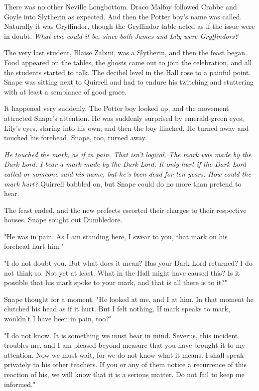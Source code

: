 There was no other Neville Longbottom. Draco Malfoy followed Crabbe and Goyle into Slytherin as expected. And then the Potter boy's name was called. Naturally it was Gryffindor, though the Gryffindor table acted as if the issue were in doubt. \emph{What else could it be, since both James and Lily were Gryffindors?}

The very last student, Blaise Zabini, was a Slytherin, and then the feast began. Food appeared on the tables, the ghosts came out to join the celebration, and all the students started to talk. The decibel level in the Hall rose to a painful point. Snape was sitting next to Quirrell and had to endure his twitching and stuttering with at least a semblance of good grace.

It happened very suddenly. The Potter boy looked up, and the movement attracted Snape's attention. He was suddenly surprised by emerald-green eyes, Lily's eyes, staring into his own, and then the boy flinched. He turned away and touched his forehead. Snape, too, turned away.

\emph{He touched the mark, as if in pain. That isn't logical. The mark was made by the Dark Lord. I bear a mark made by the Dark Lord. It only hurt if the Dark Lord called or someone said his name, but he's been dead for ten years. How could the mark hurt?} Quirrell babbled on, but Snape could do no more than pretend to hear.

The feast ended, and the new prefects escorted their charges to their respective houses. Snape sought out Dumbledore.

"He was in pain. As I am standing here, I swear to you, that mark on his forehead hurt him."

"I do not doubt you. But what does it mean? Has your Dark Lord returned? I do not think so. Not yet at least. What in the Hall might have caused this? Is it possible that his mark spoke to your mark, and that is all there is to it?"

Snape thought for a moment. "He looked at me, and I at him. In that moment he clutched his head as if it hurt. But I felt nothing. If mark speaks to mark, wouldn't I have been in pain, too?"

"I do not know. It is something we must bear in mind. Severus, this incident troubles me, and I am pleased beyond measure that you have brought it to my attention. Now we must wait, for we do not know what it means. I shall speak privately to his other teachers. If you or any of them notice a recurrence of this reaction of his, we will know that it is a serious matter. Do not fail to keep me informed."

